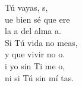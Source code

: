 \documentclass[12pt]{article}
\begin{document}
\begin{multicols*}{2}
\begin{cancion}
\begin{chorus}
	 Tú vayas, s, \\
	ue bien sé que ere \\
	la a del alma a.\\
	Si Tú vida no meas,\\
	y que vivir no o.\\
	i yo sin Ti me o, \\
	ni si Tú sin mí tas.\\
	\end{chorus}%
	\jump\\
\end{cancion}%


\end{multicols*}
\end{document}
